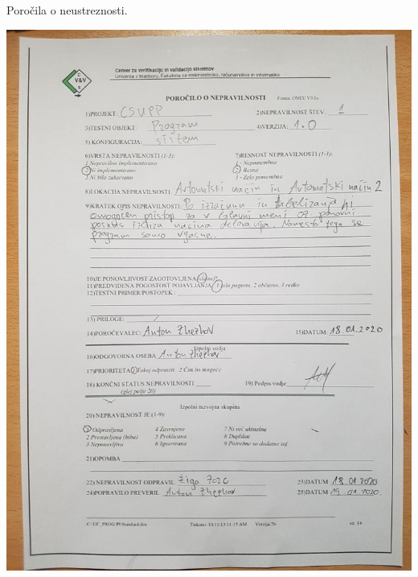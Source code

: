 \documentclass[a4paper,12pt]{article}
\begin{document}
	\quad Poročila o neustreznosti.
{
	\centering

	\vspace{2cm}

	\includegraphics[width=15cm]{porocila/01.jpg}

\newpage
	
	\hspace{2cm}

	\vspace{2cm}

}
\end{document}
